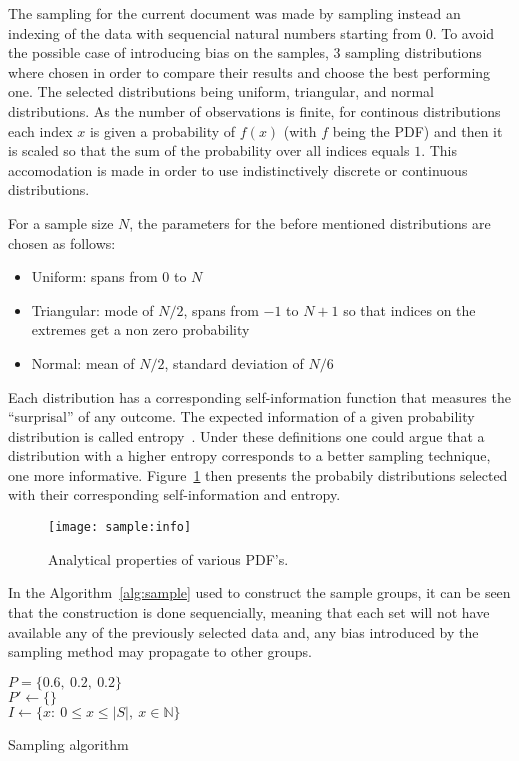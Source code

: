 \documentclass[journal]{IEEEtran}
\begin{document}
The sampling for the current document was made by sampling instead an indexing
of the data with sequencial natural numbers starting from 0. To avoid the
possible case of introducing bias on the samples, $3$ sampling distributions
where chosen in order to compare their results and choose the best performing
one. The selected distributions being uniform, triangular, and normal
distributions. As the number of observations is finite, for continous
distributions each index $x$ is given a probability of $f(x)$ (with $f$ being
the PDF) and then it is scaled so that the sum of the probability over all
indices equals $1$. This accomodation is made in order to use indistinctively
discrete or continuous distributions.

For a sample size $N$, the parameters for the before mentioned distributions 
are chosen as follows:
\begin{itemize}
    \item Uniform: spans from $0$ to $N$
    \item Triangular: mode of $N/2$, spans from $-1$ to $N+1$ so that indices on
        the extremes get a non zero probability
    \item Normal: mean of $N/2$, standard deviation of $N/6$
\end{itemize} 

Each distribution has a corresponding self-information function that measures
the ``surprisal'' of any outcome. The expected information of a given
probability distribution is called entropy~\cite{information:borda}. Under these
definitions one could argue that a distribution with a higher entropy
corresponds to a better sampling technique, one more informative.
Figure~\ref{fig:sample:info} then presents the probabily distributions selected
with their corresponding self-information and entropy.

\begin{figure}[ht]
    \texttt{[image: sample:info]}
    \caption{Analytical properties of various PDF's. \label{fig:sample:info}}
\end{figure}

In the Algorithm~\ref{alg:sample} used to construct the sample groups, it can be
seen that the construction is done sequencially, meaning that each set will not
have available any of the previously selected data and, any bias introduced by
the sampling method may propagate to other groups.

\begin{algorithm}[ht]
    $P = \{0.6,\ 0.2,\ 0.2\}$\\
    $P' \gets \{\}$\\
    $I \gets \{x:\ 0\leq x\leq \lvert S\rvert,\ x\in\mathbb{N}\}$\\
     \caption{Sampling algorithm\label{alg:sample}}
\end{algorithm}
\end{document}
